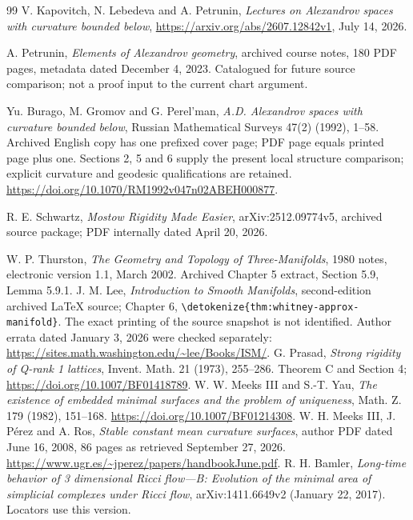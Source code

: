 \documentclass[10pt]{amsbook}
\DeclareRobustCommand{\code}[1]{\expandafter\nolinkurl\expandafter{\detokenize{#1}}}
\numberwithin{section}{chapter}
\numberwithin{equation}{chapter}
\begin{document}
\begin{thebibliography}{99}
 V. Kapovitch, N. Lebedeva and A. Petrunin,
\emph{Lectures on Alexandrov spaces with curvature bounded below},
\url{https://arxiv.org/abs/2607.12842v1}, July 14, 2026.

 A. Petrunin,
\emph{Elements of Alexandrov geometry}, archived course notes,
180 PDF pages, metadata dated December 4, 2023. Catalogued for future
source comparison; not a proof input to the current chart argument.

Yu. Burago, M. Gromov and G. Perel'man,
\emph{A.D. Alexandrov spaces with curvature bounded below},
Russian Mathematical Surveys 47(2) (1992), 1--58.
Archived English copy has one prefixed cover page; PDF page equals
printed page plus one. Sections 2, 5 and 6 supply the present local
structure comparison; explicit curvature and geodesic qualifications
are retained. \url{https://doi.org/10.1070/RM1992v047n02ABEH000877}.

 R. E. Schwartz,
\emph{Mostow Rigidity Made Easier}, arXiv:2512.09774v5,
archived source package; PDF internally dated April 20, 2026.

 W. P. Thurston, \emph{The Geometry and
Topology of Three-Manifolds}, 1980 notes, electronic version 1.1,
March 2002. Archived Chapter 5 extract, Section 5.9, Lemma 5.9.1.
 J. M. Lee, \emph{Introduction to Smooth Manifolds},
second-edition archived LaTeX source; Chapter 6,
\code{thm:whitney-approx-manifold}. The exact printing of the source
snapshot is not identified. Author errata dated January 3, 2026 were
checked separately: \url{https://sites.math.washington.edu/~lee/Books/ISM/}.
 G. Prasad, \emph{Strong rigidity of Q-rank 1 lattices},
Invent. Math. 21 (1973), 255--286. Theorem C and Section 4;
\url{https://doi.org/10.1007/BF01418789}.
 W. W. Meeks III and S.-T. Yau,
\emph{The existence of embedded minimal surfaces and the problem of
uniqueness}, Math. Z. 179 (1982), 151--168.
\url{https://doi.org/10.1007/BF01214308}.
 W. H. Meeks III, J. P\'erez and A. Ros,
\emph{Stable constant mean curvature surfaces}, author PDF dated
June 16, 2008, 86 pages as retrieved September 27, 2026.
\url{https://www.ugr.es/~jperez/papers/handbookJune.pdf}.
 R. H. Bamler,
\emph{Long-time behavior of 3 dimensional Ricci flow---B:
Evolution of the minimal area of simplicial complexes under Ricci flow},
arXiv:1411.6649v2 (January 22, 2017). Locators use this version.


\end{thebibliography}
\end{document}
